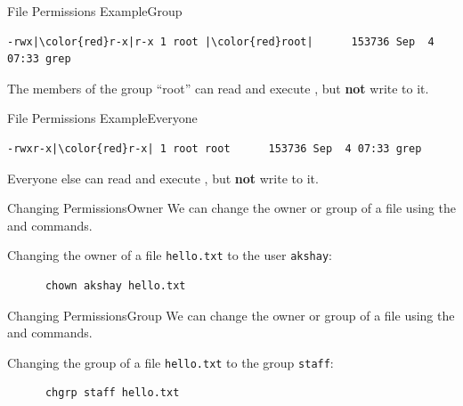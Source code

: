 \begin{frame}[fragile]{File Permissions Example}{Group}
  \begin{verbatim}
-rwx|\color{red}r-x|r-x 1 root |\color{red}root|      153736 Sep  4 07:33 grep
  \end{verbatim}

  The members of the group \enquote{root} can read and execute
  , but \textbf{not} write to it.
\end{frame}

\begin{frame}[fragile]{File Permissions Example}{Everyone}
  \begin{verbatim}
-rwxr-x|\color{red}r-x| 1 root root      153736 Sep  4 07:33 grep
  \end{verbatim}

  Everyone else can read and execute , but \textbf{not}
  write to it.
\end{frame}

\begin{frame}[fragile]{Changing Permissions}{Owner}
  We can change the owner or group of a file using the  and
   commands.

  \begin{example}[chown]
    Changing the owner of a file \texttt{hello.txt} to the user \texttt{akshay}:
    \begin{verbatim}
      chown akshay hello.txt
    \end{verbatim}
  \end{example}
\end{frame}

\begin{frame}[fragile]{Changing Permissions}{Group}
  We can change the owner or group of a file using the  and
   commands.

  \begin{example}[chgrp]
    Changing the group of a file \texttt{hello.txt} to the group \texttt{staff}:
    \begin{verbatim}
      chgrp staff hello.txt
    \end{verbatim}
  \end{example}
\end{frame}

